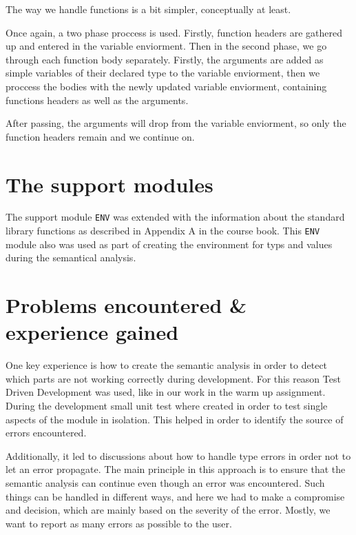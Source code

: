 \documentclass{article}
\begin{document}
The way we handle functions is a bit simpler, conceptually at least.

Once again, a two phase proccess is used. Firstly, function headers are gathered up and entered in the variable enviorment. Then in the second phase,
we go through each function body separately. Firstly, the arguments are added as simple variables of their declared type to the 
variable enviorment, then we proccess the bodies with the newly updated variable enviorment, containing functions headers as
well as the arguments.

After passing, the arguments will drop from the variable enviorment, so only the function headers remain and we continue on.



\section{The support modules}

The support module \texttt{ENV} was extended with the information about the standard library functions as described in Appendix A in the course book. This \texttt{ENV} module also was used as part of creating the environment for typs and values during the semantical analysis. 


\section{Problems encountered \& experience gained}

One key experience is how to create the semantic analysis in order to detect which parts are not working correctly during development. For this reason Test Driven Development was used, like in our work in the warm up assignment. During the development small unit test where created in order to test single aspects of the module in isolation. This helped in order to identify the source of errors encountered.

Additionally, it led to discussions about how to handle type errors in order not to let an error propagate. The main principle in this approach is to ensure that the semantic analysis can continue even though an error was encountered. Such things can be handled in different ways, and here we had to make a compromise and decision, which are mainly based on the severity of the error. Mostly, we want to report as many errors as possible to the user.
\end{document}
